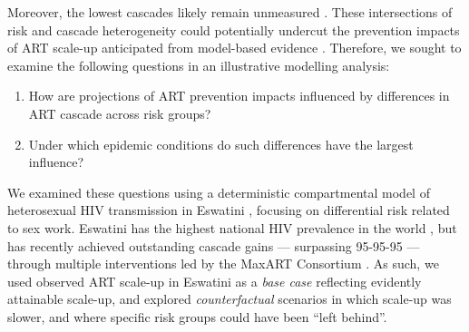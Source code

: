 Moreover, the lowest cascades likely remain unmeasured \cite{Hakim2018,Boothe2021}.
These intersections of risk and cascade heterogeneity
could potentially undercut the prevention impacts of ART scale-up
anticipated from model-based evidence \cite{Baral2019}.
Therefore, we sought to examine the following questions
in an illustrative modelling analysis:
\begin{enumerate}
  \item\label{obj:1} How are projections of ART prevention impacts
    influenced by differences in ART cascade across risk groups?
  \item\label{obj:2} Under which epidemic conditions
    do such differences have the largest influence?
\end{enumerate}
We examined these questions using
a deterministic compartmental model of heterosexual HIV transmission in Eswatini \cite{Knight2019},
focusing on differential risk related to sex work.
Eswatini has the highest national HIV prevalence in the world \cite{UNAIDS2021},
but has recently achieved outstanding cascade gains --- surpassing 95-95-95 ---
through multiple interventions led by the MaxART Consortium \cite{Walsh2020,AIDSinfo}.
As such, we used observed ART scale-up in Eswatini as a \emph{base case}
reflecting evidently attainable scale-up,
and explored \emph{counterfactual} scenarios in which scale-up was slower,
and where specific risk groups could have been ``left behind''.
